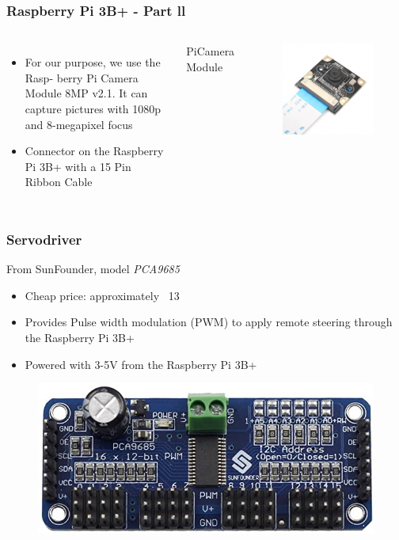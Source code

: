 \documentclass{beamer}
\begin{document}
\begin{frame}
\frametitle{Raspberry Pi 3B+ - Part ll}
\begin{columns}[c] %
\begin{itemize}
\item For our purpose, we use the Rasp- berry Pi Camera Module 8MP v2.1. It can capture pictures with 1080p and 8-megapixel focus \\
\item Connector on the Raspberry Pi 3B+ with a 15 Pin Ribbon Cable
\end{itemize}

PiCamera Module
\begin{figure}
\includegraphics[width=0.7\linewidth]{photo/camera.jpg}
\end{figure}
\end{columns}

\end{frame}


\begin{frame}
\frametitle{Servodriver}
From SunFounder, model \textit{PCA9685}
\begin{itemize}
\item Cheap price: approximately ~13
\item Provides Pulse width modulation (PWM) to apply remote steering through the Raspberry Pi 3B+
\item Powered with 3-5V from the Raspberry Pi 3B+
\end{itemize}
\begin{figure}
\includegraphics[width=0.4\linewidth]{photo/sunfounder.jpeg}
\end{figure}
\end{frame}
\end{document}
